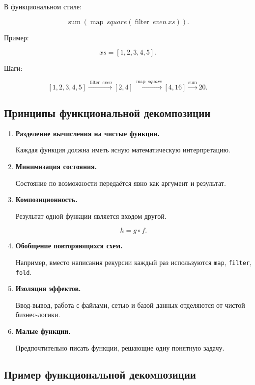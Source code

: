 \documentclass[12pt,a4paper]{article}
\begin{document}
В функциональном стиле:

\[
\operatorname{sum}(\operatorname{map}\ square(\operatorname{filter}\ even\ xs)).
\]

Пример:

\[
xs = [1,2,3,4,5].
\]

Шаги:

\[
[1,2,3,4,5]
\xrightarrow{\operatorname{filter}\ even}
[2,4]
\xrightarrow{\operatorname{map}\ square}
[4,16]
\xrightarrow{\operatorname{sum}}
20.
\]

\subsection{Принципы функциональной декомпозиции}

\begin{enumerate}
  \item \textbf{Разделение вычисления на чистые функции.}

  Каждая функция должна иметь ясную математическую интерпретацию.

  \item \textbf{Минимизация состояния.}

  Состояние по возможности передаётся явно как аргумент и результат.

  \item \textbf{Композиционность.}

  Результат одной функции является входом другой.

  \[
  h = g \circ f.
  \]

  \item \textbf{Обобщение повторяющихся схем.}

  Например, вместо написания рекурсии каждый раз используются \texttt{map}, \texttt{filter}, \texttt{fold}.

  \item \textbf{Изоляция эффектов.}

  Ввод-вывод, работа с файлами, сетью и базой данных отделяются от чистой бизнес-логики.

  \item \textbf{Малые функции.}

  Предпочтительно писать функции, решающие одну понятную задачу.
\end{enumerate}

\subsection{Пример функциональной декомпозиции}
\end{document}
